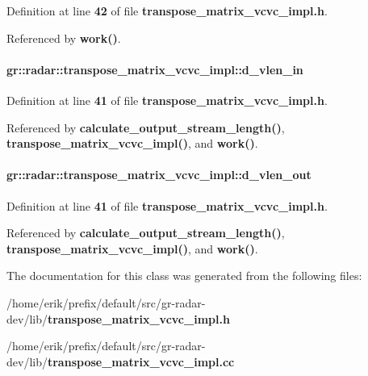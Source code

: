 Definition at line {\bf 42} of file {\bf transpose\+\_\+matrix\+\_\+vcvc\+\_\+impl.\+h}.



Referenced by {\bf work()}.

\paragraph[{d\+\_\+vlen\+\_\+in}]{ gr\+::radar\+::transpose\+\_\+matrix\+\_\+vcvc\+\_\+impl\+::d\+\_\+vlen\+\_\+in}\label{classgr_1_1radar_1_1transpose__matrix__vcvc__impl_a1be85d467927add7bdd704e0798e070a}


Definition at line {\bf 41} of file {\bf transpose\+\_\+matrix\+\_\+vcvc\+\_\+impl.\+h}.



Referenced by {\bf calculate\+\_\+output\+\_\+stream\+\_\+length()}, {\bf transpose\+\_\+matrix\+\_\+vcvc\+\_\+impl()}, and {\bf work()}.

\paragraph[{d\+\_\+vlen\+\_\+out}]{ gr\+::radar\+::transpose\+\_\+matrix\+\_\+vcvc\+\_\+impl\+::d\+\_\+vlen\+\_\+out}\label{classgr_1_1radar_1_1transpose__matrix__vcvc__impl_abff88d3a70e284bfc61d994220d719a4}


Definition at line {\bf 41} of file {\bf transpose\+\_\+matrix\+\_\+vcvc\+\_\+impl.\+h}.



Referenced by {\bf calculate\+\_\+output\+\_\+stream\+\_\+length()}, {\bf transpose\+\_\+matrix\+\_\+vcvc\+\_\+impl()}, and {\bf work()}.



The documentation for this class was generated from the following files\+:\begin{DoxyCompactItemize}
\item 
/home/erik/prefix/default/src/gr-\/radar-\/dev/lib/{\bf transpose\+\_\+matrix\+\_\+vcvc\+\_\+impl.\+h}\item 
/home/erik/prefix/default/src/gr-\/radar-\/dev/lib/{\bf transpose\+\_\+matrix\+\_\+vcvc\+\_\+impl.\+cc}\end{DoxyCompactItemize}
